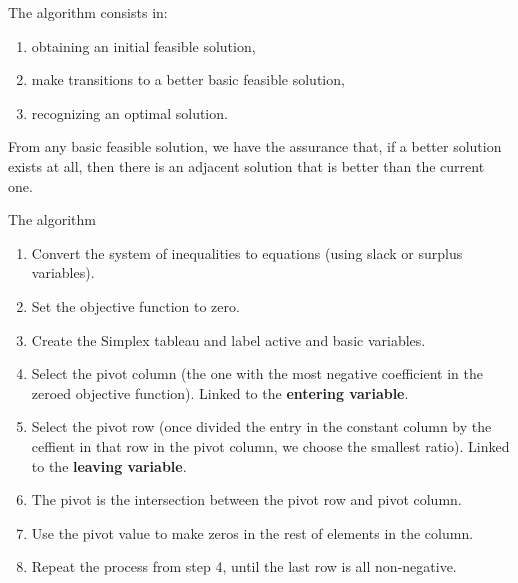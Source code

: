 \documentclass[c]{beamer}
\begin{document}
\begin{frame}
The algorithm consists in:
\begin{enumerate}
  \item obtaining an initial feasible
solution,
\item make transitions to a better basic feasible solution,
\item recognizing an optimal solution.
\end{enumerate}
From any basic feasible solution, we have the assurance
that, if a better solution exists at all, then there is an adjacent solution that is better than the
current one.\cite{carter}
\end{frame}

\begin{frame}{The algorithm}
\begin{enumerate}
  \item Convert the system of inequalities to equations (using slack or surplus variables).
  \item Set the objective function to zero.
  \item Create the Simplex tableau and label active and basic variables.
  \item Select the pivot column (the one with the most negative coefficient in the zeroed objective function). Linked to the {\bf entering variable}.
  \item Select the pivot row (once divided the entry in the constant column by the ceffient in that row in the pivot column, we choose the smallest ratio). Linked to the {\bf leaving variable}.
  \item The pivot is the intersection between the pivot row and pivot column.
  \item Use the pivot value to make zeros in the rest of elements in the column.
  \item Repeat the process from step 4, until the last row is all non-negative.
\end{enumerate}

\end{frame}
\end{document}
